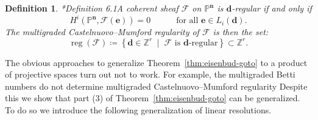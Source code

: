 \documentclass[11pt,reqno]{amsart}
\newtheorem{defn}[lemma]{Definition}
\theoremstyle{remark}
\newcommand{\reg}{\operatorname{reg}}
\newcommand{\Nef}{\operatorname{Nef}}
\newcommand{\dd}{\mathbf d}
\newcommand{\ee}{\mathbf e}
\newcommand{\nn}{\mathbf n}
\newcommand{\cF}{\mathcal{F}}
\renewcommand{\O}{\mathcal{O}}
\newcommand{\N}{\mathbb{N}}
\renewcommand{\P}{\mathbb{P}}
\newcommand{\Z}{\mathbb{Z}}
\begin{document}
\begin{defn}\cite{maclaganSmith04}*{Definition 6.1}\label{def:mg-reg}
A coherent sheaf $\cF$ on $\P^{\nn}$ is $\dd$-regular if and only if
\[
H^i\left(\P^{\nn}, \cF(\ee)\right) =0 \quad \quad \quad \text{for all $\ee\in L_{i}(\dd)$}.
\]
The multigraded Castelnuovo--Mumford regularity of $\cF$ is then the set: 
\[
\reg(\cF) \coloneqq \left \{ \dd\in \Z^{r} \;\; \big| \;\; \text{$\cF$ is $\dd$-regular}\right\}\subset \Z^{r}.
\]
\end{defn}



The obvious approaches to generalize Theorem~\ref{thm:eisenbud-goto} to a product of projective spaces turn out not to work. For example, the multigraded Betti numbers do not determine multigraded Castelnuovo--Mumford regularity \cite[Example 5.1]{bruceHellerSayrafi21} Despite this we show that part (3) of Theorem~\ref{thm:eisenbud-goto} can be generalized. To do so we introduce the following generalization of linear resolutions. 
\end{document}
